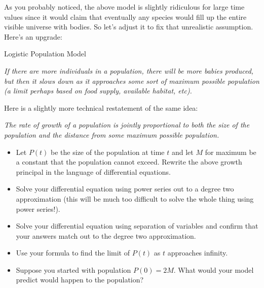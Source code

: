 As you probably noticed, the above model is slightly ridiculous for large time values since it would claim that eventually any species would fill up the entire visible universe with bodies.  So let's adjust it to fix that unrealistic assumption. Here's an upgrade:

\begin{exercise}{ Logistic Population Model \Coffeecup \Coffeecup \Coffeecup}

\begin{center}
\emph{If there are more individuals in a population, there will be more babies produced, but then it slows down as it approaches some sort of maximum possible population (a limit perhaps based on food supply, available habitat, etc).}
\end{center}

Here is a slightly more technical restatement of the same idea:

\begin{center}
\emph{The rate of growth of a population is jointly proportional to both the size of the population and the distance from some maximum possible population.}
\end{center}

\begin{itemize}
\item Let $P(t)$ be the size of the population at time $t$ and let $M$ for maximum be a constant that the population cannot exceed.  Rewrite the above growth principal in the language of differential equations.
\vspace*{1in}
\item Solve your differential equation using power series out to a degree two approximation (this will be much too difficult to solve the whole thing using power series!). 
\vspace*{4in}
\item Solve your differential equation using separation of variables and confirm that your answers match out to the degree two approximation.
\vspace*{2in}
\item Use your formula to find the limit of $P(t)$ as $t$ approaches infinity.  
\vspace*{2in}
\item Suppose you started with population $P(0)=2M$.  What would your model predict would happen to the population?
\vspace*{2in}
\end{itemize}
\end{exercise}
